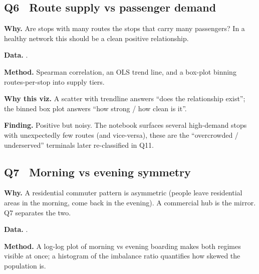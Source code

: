 \subsection{Q6 \textbullet\ Route supply vs passenger demand}

\textbf{Why.} Are stops with many routes the stops that carry many
passengers? In a healthy network this should be a clean positive
relationship.

\textbf{Data.} .

\textbf{Method.} Spearman correlation, an OLS trend line, and a
box-plot binning routes-per-stop into supply tiers.


\textbf{Why this viz.} A scatter with trendline answers ``does the
relationship exist''; the binned box plot answers ``how strong / how
clean is it''.

\textbf{Finding.} Positive but noisy. The notebook surfaces several
high-demand stops with unexpectedly few routes (and vice-versa),
these are the ``overcrowded / underserved'' terminals later
re-classified in Q11.

\subsection{Q7 \textbullet\ Morning vs evening symmetry}

\textbf{Why.} A residential commuter pattern is asymmetric (people
leave residential areas in the morning, come back in the evening). A
commercial hub is the mirror. Q7 separates the two.

\textbf{Data.} .

\textbf{Method.} A log-log plot of morning vs evening boarding makes
both regimes visible at once; a histogram of the imbalance ratio
quantifies how skewed the population is.


